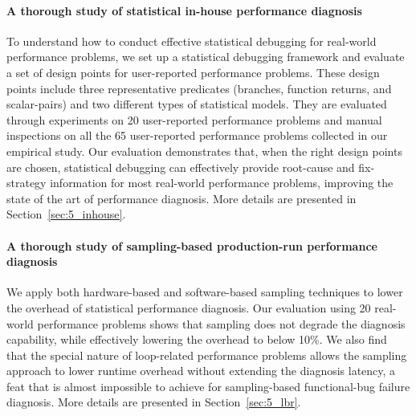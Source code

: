 \paragraph{A thorough study of statistical in-house performance diagnosis}
To understand how to conduct effective statistical debugging for real-world
performance problems, we set up a statistical debugging framework and evaluate
a set of design points for user-reported performance problems. These
design points include
three representative predicates (branches, function returns, and scalar-pairs)
and two different types of statistical models. They are evaluated through 
experiments on 
20 user-reported performance problems and manual inspections on
all the 65 user-reported performance problems collected in our empirical study. 
Our evaluation
demonstrates that, when the right design points are chosen, statistical
debugging can effectively provide root-cause and fix-strategy information
for most real-world performance problems,
improving the state of the art of performance diagnosis. 
More details are presented
in Section~\ref{sec:5_inhouse}.

\paragraph{A thorough study of sampling-based production-run performance diagnosis}
We apply both hardware-based and software-based sampling techniques to
lower the overhead of statistical performance diagnosis.
Our evaluation using 20 real-world performance problems shows that
sampling does not degrade the diagnosis capability, while effectively
lowering the overhead to below 10\%. We also find that the special
nature of loop-related performance problems allows the sampling approach
to lower runtime overhead without extending the diagnosis latency,
a feat that is almost impossible to achieve for sampling-based
functional-bug failure diagnosis. More details are presented in Section~\ref{sec:5_lbr}.
